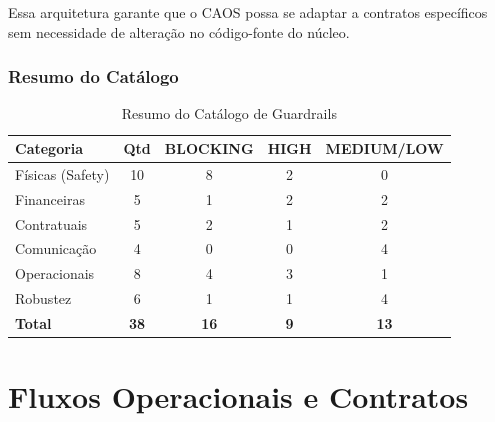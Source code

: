 \documentclass[12pt, a4paper]{article}
\begin{document}
Essa arquitetura garante que o CAOS possa se adaptar a contratos específicos sem necessidade de alteração no código-fonte do núcleo.

\subsubsection{Resumo do Catálogo}

\begin{table}[h!]
\centering
\begin{tabular}{|l|c|c|c|c|}
\hline
\textbf{Categoria} & \textbf{Qtd} & \textbf{BLOCKING} & \textbf{HIGH} & \textbf{MEDIUM/LOW} \\ \hline
Físicas (Safety) & 10 & 8 & 2 & 0 \\ \hline
Financeiras & 5 & 1 & 2 & 2 \\ \hline
Contratuais & 5 & 2 & 1 & 2 \\ \hline
Comunicação & 4 & 0 & 0 & 4 \\ \hline
Operacionais & 8 & 4 & 3 & 1 \\ \hline
Robustez & 6 & 1 & 1 & 4 \\ \hline
\textbf{Total} & \textbf{38} & \textbf{16} & \textbf{9} & \textbf{13} \\ \hline
\end{tabular}
\caption{Resumo do Catálogo de Guardrails}
\end{table}

\newpage

\section{Fluxos Operacionais e Contratos}
\label{sec:fluxos}
\end{document}
